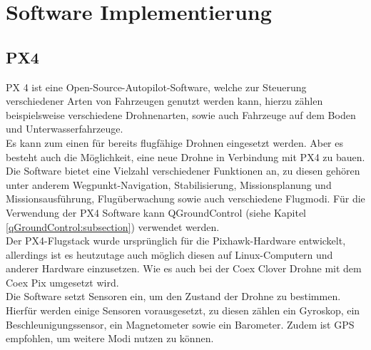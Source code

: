 \chapter{Software Implementierung}

\section{PX4} \label{px4:section}
PX 4 ist eine Open-Source-Autopilot-Software, welche zur Steuerung verschiedener Arten von Fahrzeugen genutzt werden kann, hierzu zählen beispielsweise verschiedene Drohnenarten, sowie auch Fahrzeuge auf dem Boden und Unterwasserfahrzeuge.\\ Es kann zum einen für bereits flugfähige Drohnen eingesetzt werden. Aber es besteht auch die Möglichkeit, eine neue Drohne in Verbindung mit PX4 zu bauen.\\
Die Software bietet eine Vielzahl verschiedener Funktionen an, zu diesen gehören unter anderem Wegpunkt-Navigation, Stabilisierung, Missionsplanung und Missionsausführung, Flugüberwachung sowie auch verschiedene Flugmodi.
Für die Verwendung der PX4 Software kann QGroundControl (siehe Kapitel \ref{qGroundControl:subsection}) verwendet werden. \cite[vgl.][]{px4} \\

Der PX4-Flugstack wurde ursprünglich für die Pixhawk-Hardware entwickelt, allerdings ist es heutzutage auch möglich diesen auf Linux-Computern und anderer Hardware einzusetzen. Wie es auch bei der Coex Clover Drohne mit dem Coex Pix umgesetzt wird. \\
Die Software setzt Sensoren ein, um den Zustand der Drohne zu bestimmen. Hierfür werden einige Sensoren vorausgesetzt, zu diesen zählen ein Gyroskop, ein Beschleunigungssensor, ein Magnetometer sowie ein Barometer. Zudem ist GPS empfohlen, um weitere Modi nutzen zu können. \cite[vgl.][]{px4}

